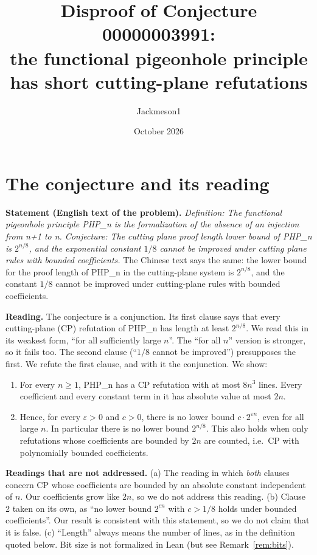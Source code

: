 \documentclass[11pt]{article}
\title{Disproof of Conjecture 00000003991:\\ the functional pigeonhole principle has short cutting-plane refutations}
\author{Jackmeson1}
\date{October 2026}
\theoremstyle{definition}
\begin{document}
\maketitle

\section{The conjecture and its reading}

\textbf{Statement (English text of the problem).} \emph{Definition: The functional pigeonhole principle
PHP\_n is the formalization of the absence of an injection from n+1 to n. Conjecture: The cutting plane
proof length lower bound of PHP\_n is $2^{n/8}$, and the exponential constant $1/8$ cannot be improved under
cutting plane rules with bounded coefficients.} The Chinese text says the same: the lower bound for the
proof length of PHP\_n in the cutting-plane system is $2^{n/8}$, and the constant $1/8$ cannot be improved
under cutting-plane rules with bounded coefficients.

\textbf{Reading.} The conjecture is a conjunction. Its first clause says that every cutting-plane (CP)
refutation of PHP\_n has length at least $2^{n/8}$. We read this in its weakest form, ``for all
sufficiently large $n$''. The ``for all $n$'' version is stronger, so it fails too. The second clause
(``$1/8$ cannot be improved'') presupposes the first. We refute the first clause, and with it the
conjunction. We show:
\begin{enumerate}
\item For every $n\ge 1$, PHP\_n has a CP refutation with at most $8n^3$ lines. Every coefficient and every
  constant term in it has absolute value at most $2n$.
\item Hence, for every $\varepsilon>0$ and $c>0$, there is no lower bound $c\cdot 2^{\varepsilon n}$, even for
  all large $n$. In particular there is no lower bound $2^{n/8}$. This also holds when only refutations
  whose coefficients are bounded by $2n$ are counted, i.e.\ CP with polynomially bounded coefficients.
\end{enumerate}

\textbf{Readings that are not addressed.} (a) The reading in which \emph{both} clauses concern CP whose
coefficients are bounded by an absolute constant independent of $n$. Our coefficients grow like $2n$, so
we do not address this reading. (b) Clause 2 taken on its own, as ``no lower bound $2^{cn}$ with $c>1/8$
holds under bounded coefficients''. Our result is consistent with this statement, so we do not claim
that it is false. (c) ``Length'' always means the number of lines, as in the definition quoted below.
Bit size is not formalized in Lean (but see Remark~\ref{rem:bits}).
\end{document}
